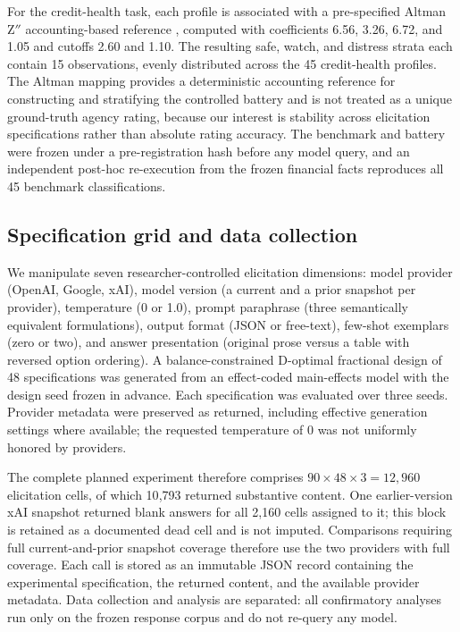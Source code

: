 \documentclass[pdflatex,sn-nature,lineno]{sn-jnl}
\theoremstyle{thmstyleone}
\begin{document}
For the credit-health task, each profile is associated with a pre-specified Altman Z$''$ accounting-based
reference \cite{altman1968}, computed with coefficients 6.56, 3.26, 6.72, and 1.05 and cutoffs 2.60 and
1.10. The resulting safe, watch, and distress strata each contain 15 observations, evenly distributed
across the 45 credit-health profiles. The Altman mapping provides a deterministic accounting reference
for constructing and stratifying the controlled battery and is not treated as a unique ground-truth
agency rating, because our interest is stability across elicitation specifications rather than absolute
rating accuracy. The benchmark and battery were frozen under a pre-registration hash before any model
query, and an independent post-hoc re-execution from the frozen financial facts reproduces all 45
benchmark classifications.

\subsection{Specification grid and data collection}
We manipulate seven researcher-controlled elicitation dimensions: model provider (OpenAI, Google, xAI),
model version (a current and a prior snapshot per provider), temperature (0 or 1.0), prompt paraphrase
(three semantically equivalent formulations), output format (JSON or free-text), few-shot exemplars (zero
or two), and answer presentation (original prose versus a table with reversed option ordering). A
balance-constrained D-optimal fractional design of 48 specifications was generated from an effect-coded
main-effects model with the design seed frozen in advance. Each specification was evaluated over three
seeds. Provider metadata were preserved as returned, including effective generation settings where
available; the requested temperature of 0 was not uniformly honored by providers.

The complete planned experiment therefore comprises $90\times48\times3=12{,}960$ elicitation cells, of which
10{,}793 returned substantive content. One earlier-version xAI snapshot returned blank answers for all
2{,}160 cells assigned to it; this block is retained as a documented dead cell and is not imputed.
Comparisons requiring full current-and-prior snapshot coverage therefore use the two providers with full
coverage. Each call is stored as an immutable JSON record containing the experimental specification, the
returned content, and the available provider metadata. Data collection and analysis are separated: all
confirmatory analyses run only on the frozen response corpus and do not re-query any model.
\end{document}

